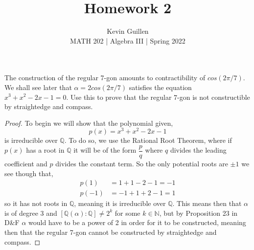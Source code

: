 \documentclass[11pt]{article}
\newenvironment{problem}[2][Problem\!]{\begin{trivlist}
\item[\hskip \labelsep {\bfseries #1}\hskip \labelsep {\bfseries #2}]}{\end{trivlist}}
\newcommand{\qq}{\mathbb Q}   %
\newcommand{\nn}{\mathbb N}   %
\newcommand{\lrb}[1]{\left[#1\right]}
\begin{document}
 
\title{Homework 2}
\author{Kevin Guillen\\[0.5em]
MATH 202 | Algebra III | Spring 2022}
\date{} 
\maketitle


\begin{problem} {13.3.4}
    The construction of the regular 7-gon amounts to contractibility of $cos(2\pi / 7).$ We shall see later that $\alpha = 2cos(2\pi / 7)$ satisfies the equation $x^{3} + x^{2} -2x -1 = 0$. Use this to prove that the regular $7$-gon is not constructible by straightedge and compass. 
\end{problem}
\begin{example}
    \begin{proof}
        To begin we will show that the polynomial given,
        \[p(x) = x^{3} + x^{2}  -2x - 1\] is irreducible over $\qq$. To do so, we use the Rational Root Theorem, where if $p(x)$ has a root in $\qq$ it will be of the form $\dfrac{p}{q}$ where $q$ divides the leading coefficient and $p$ divides the constant term. So the only potential roots are $\pm 1$ we see though that,
        \begin{align*}
            p(1) &= 1 + 1 - 2 - 1 = -1 \\
            p(-1) &= -1 + 1 +2 -1 = 1 
        \end{align*}
        so it has not roots in $\qq$, meaning it is irreducible over $\qq$. This means then that $\alpha$ is of degree 3 and $\lrb{\qq(\alpha)
        : \qq} \neq 2^{k}$ for some $k \in \nn$, but by Proposition 23 in D\&F $\alpha$ would have to be a power of 2 in order for it to be constructed, meaning then that the regular 7-gon cannot be constructed by straightedge and compass. 
    \end{proof}
\end{example}

\vspace*{.5in}
\end{document}
